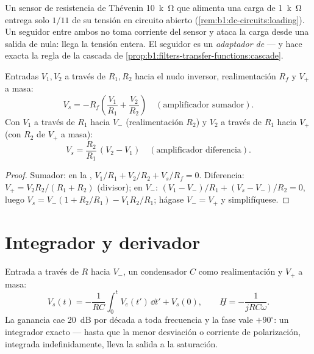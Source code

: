 \begin{example}\label{ex:b1:operational-amplifier:follower}
Un sensor de resistencia de Thévenin \qty{10}{k\ohm} que alimenta una
carga de \qty{1}{k\ohm} entrega solo $1/11$ de su tensión en circuito
abierto (\cref{rem:b1:dc-circuits:loading}). Un seguidor entre ambos no
toma corriente del sensor y ataca la carga desde una salida de 
nula: llega la tensión entera. El seguidor es un \emph{adaptador de
} --- y hace exacta la regla de la cascada de
\cref{prop:b1:filters-transfer-functions:cascade}.
\end{example}

\begin{proposition}\label{prop:b1:operational-amplifier:sumdiff}
Entradas $V_1, V_2$ a través de $R_1, R_2$ hacia el nudo inversor,
realimentación $R_f$ y $V_+$ a masa:
\[
V_s = -R_f\left(\frac{V_1}{R_1} + \frac{V_2}{R_2}\right)
\quad (\text{amplificador sumador}).
\]
Con $V_1$ a través de $R_1$ hacia $V_-$ (realimentación $R_2$) y $V_2$ a
través de $R_1$ hacia $V_+$ (con $R_2$ de $V_+$ a masa):
\[
V_s = \frac{R_2}{R_1}\,(V_2 - V_1)
\quad (\text{amplificador diferencia}).
\]
\end{proposition}

\begin{proof}
Sumador:  en la , $V_1/R_1 + V_2/R_2 + V_s/R_f =
0$. Diferencia: $V_+ = V_2R_2/(R_1 + R_2)$ (divisor);  en
$V_-$: $(V_1 - V_-)/R_1 + (V_s - V_-)/R_2 = 0$, luego $V_s = V_-(1 + R_2/R_1) -
V_1R_2/R_1$; hágase $V_- = V_+$ y simplifíquese.
\end{proof}

\section{Integrador y derivador}

\begin{proposition}[Integrador]\label{prop:b1:operational-amplifier:integrator}
Entrada a través de $R$ hacia $V_-$, un condensador $C$ como
realimentación y $V_+$ a masa:
\[
V_s(t) = -\frac{1}{RC}\int_0^t V_e(t')\,\dd t' + V_s(0),
\qquad
\underline H = -\frac{1}{jRC\omega} .
\]
La ganancia cae \qty{20}{dB} por década a toda frecuencia y la fase vale
$+90^\circ$: un integrador exacto --- hasta que la menor desviación o
corriente de polarización, integrada indefinidamente, lleva la salida a la
saturación.
\end{proposition}

